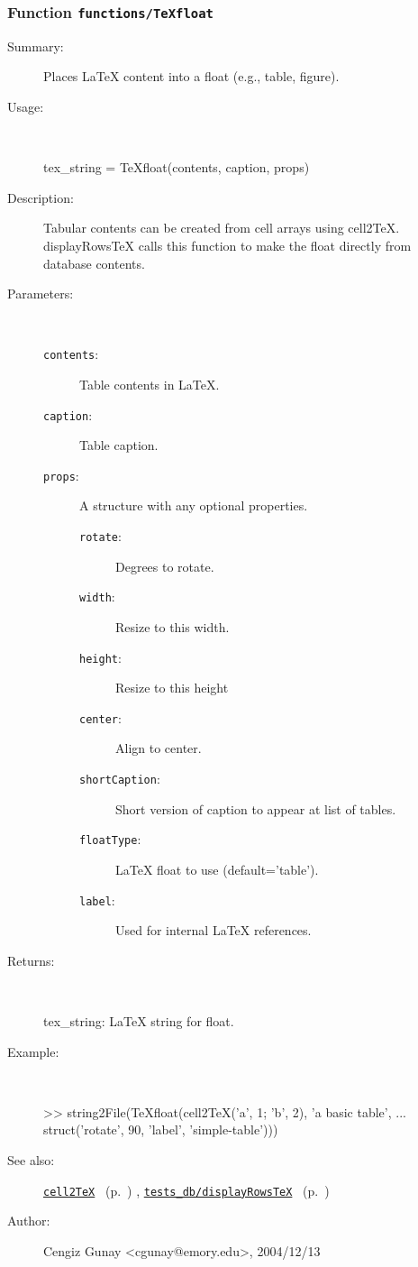 \subsubsection[Function \texttt{TeXfloat}]{Function \texttt{functions/TeXfloat}}%
%
\label{ref_functions__TeXfloat}%
\hypertarget{ref_functions__TeXfloat}{}%
\begin{description}
\item[Summary:]Places LaTeX content into a float (e.g., table, figure).
%
\item[Usage:]~%
\begin{lyxcode}%
tex\_string = TeXfloat(contents, caption, props)
%
\end{lyxcode}%
%
\item[Description:]%
Tabular contents can be created from cell arrays using
 cell2TeX. displayRowsTeX calls this function to make the float directly
 from database contents.
\item[Parameters:]~
\begin{description}%
\item[\texttt{contents}:]
 Table contents in LaTeX.
\item[\texttt{caption}:]
 Table caption.
\item[\texttt{props}:]
 A structure with any optional properties.
\begin{description}%
\item[\texttt{rotate}:]
 Degrees to rotate.
\item[\texttt{width}:]
 Resize to this width.
\item[\texttt{height}:]
 Resize to this height
\item[\texttt{center}:]
 Align to center.
\item[\texttt{shortCaption}:]
 Short version of caption to appear at list of tables.
\item[\texttt{floatType}:]
 LaTeX float to use (default='table').
\item[\texttt{label}:]
 Used for internal LaTeX references.
\end{description}%
\end{description}%
%
\item[Returns:
]~

   tex\_string: LaTeX string for float.
%
\item[Example:]~
\begin{lyxcode} >> string2File(TeXfloat(cell2TeX({'a', 1; 'b', 2}), 'a basic table', ...
\\%
                 struct('rotate', 90, 'label', 'simple-table')))
\\%
\end{lyxcode}
%
\item[See also:]%
\hyperlink{ref_cell2TeX}{\texttt{cell2TeX}}%
\ (p.~\pageref{ref_cell2TeX})%
%
, \hyperlink{ref_tests_db__displayRowsTeX}{\texttt{tests\_db/displayRowsTeX}}%
\ (p.~\pageref{ref_tests_db__displayRowsTeX})%
%
%
\item[Author:]%
Cengiz Gunay <cgunay@emory.edu>, 2004/12/13
%
\end{description}
\methodline%
